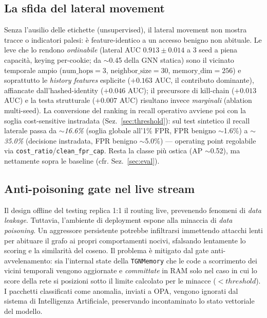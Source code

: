 \documentclass[11pt,a4paper]{report}
\begin{document}
\subsection{La sfida del lateral movement}

Senza l'ausilio delle etichette (unsupervised), il lateral movement non mostra tracce o indicatori palesi: è feature-identico a un accesso benigno non abituale. Le leve che lo rendono \emph{ordinabile} (lateral AUC $0.913\pm0.014$ a 3 seed a piena capacità, keying per-cookie; da $\sim$0.45 della GNN statica) sono il vicinato temporale ampio ($\text{num\_hops}{=}3$, $\text{neighbor\_size}{=}30$, $\text{memory\_dim}{=}256$) e soprattutto le \textit{history features} esplicite ($+0.163$ AUC, il contributo dominante), affiancate dall'hashed-identity ($+0.046$ AUC); il precursore di kill-chain ($+0.013$ AUC) e la testa strutturale ($+0.007$ AUC) risultano invece \emph{marginali} (ablation multi-seed). La conversione del ranking in recall operativo avviene poi con la soglia cost-sensitive instradata (Sez.~\ref{sec:threshold}): sul test sintetico il recall laterale passa da $\sim$\textit{16.6\%} (soglia globale all'1\% FPR, FPR benigno $\sim$1.6\%) a $\sim$\textit{35.0\%} (decisione instradata, FPR benigno $\sim$5.0\%) --- operating point regolabile via \texttt{cost\_ratio}/\texttt{clean\_fpr\_cap}. Resta la classe più ostica (AP $\sim$0.52), ma nettamente sopra le baseline (cfr. Sez.~\ref{sec:eval}).

\subsection{Anti-poisoning gate nel live stream}

Il design offline del testing replica 1:1 il routing live, prevenendo fenomeni di \textit{data leakage}. Tuttavia, l'ambiente di deployment espone alla minaccia di \textit{data poisoning}. Un aggressore persistente potrebbe infiltrarsi immettendo attacchi lenti per abituare il grafo ai propri comportamenti nocivi, sfalsando lentamente lo scoring e la similarità del coseno. Il problema è mitigato dal gate anti-avvelenamento: sia l'internal state della \texttt{TGNMemory} che le code a scorrimento dei vicini temporali vengono aggiornate e \textit{committate} in RAM solo nel caso in cui lo score della rete si posizioni sotto il limite calcolato per le minacce ($< threshold$). I pacchetti classificati come anomalia, inviati a OPA, vengono ignorati dal sistema di Intelligenza Artificiale, preservando incontaminato lo stato vettoriale del modello.
\end{document}
